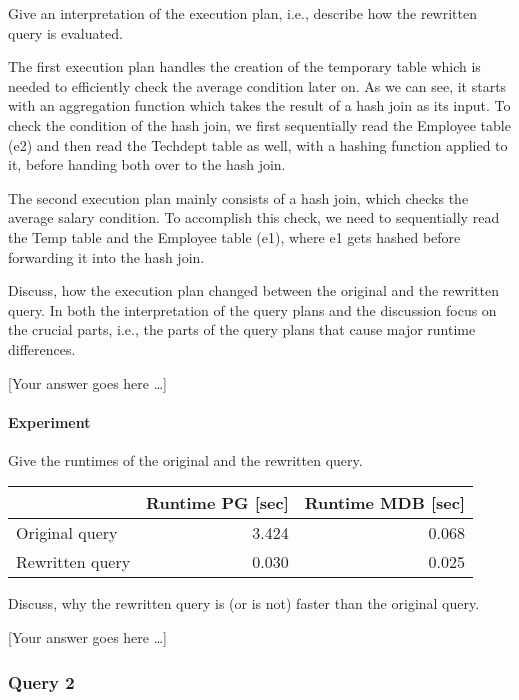 \documentclass[11pt]{scrartcl}
\newcommand{\youranswerhere}{[Your answer goes here \ldots]}
\begin{document}
    Give an interpretation of the execution plan, i.e., describe how the rewritten query is evaluated.

    The first execution plan handles the creation of the temporary table which is needed to efficiently check the
    average condition later on.
    As we can see, it starts with an aggregation function which takes the result of a hash join as its input.
    To check the condition of the hash join, we first sequentially read the Employee table (e2) and then read the
    Techdept table as well, with a hashing function applied to it, before handing both over to the hash join.

    The second execution plan mainly consists of a hash join, which checks the average salary condition.
    To accomplish this check, we need to sequentially read the Temp table and the Employee table (e1), where e1 gets hashed
    before forwarding it into the hash join.


    Discuss, how the execution plan changed between the original and the rewritten query.
    In both the interpretation of the query plans and the discussion focus on the crucial parts, i.e., the parts of the
    query plans that cause major runtime differences.

    \youranswerhere{}

    \paragraph{Experiment}

    Give the runtimes of the original and the rewritten query.

    \begin{table}[H]
        \centering
        \begin{tabular}{l|r|r}
            & Runtime PG [sec] & Runtime MDB [sec] \tabularnewline
            \hline
            Original query & 3.424 & 0.068 \tabularnewline
            Rewritten query & 0.030 & 0.025 \tabularnewline
        \end{tabular}
    \end{table}

    Discuss, why the rewritten query is (or is not) faster than the original query.

    \youranswerhere{}

    \subsubsection*{Query 2}
\end{document}
